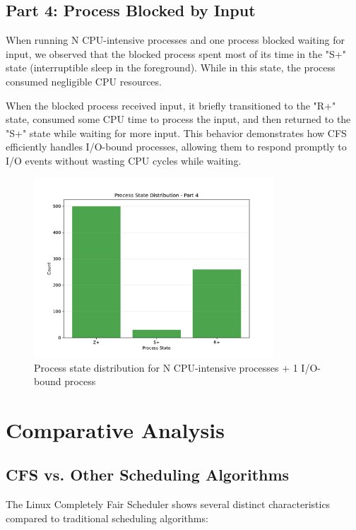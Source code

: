 \documentclass[12pt,a4paper]{article}
\begin{document}
\subsection{Part 4: Process Blocked by Input}

When running N CPU-intensive processes and one process blocked waiting for input, we observed that the blocked process spent most of its time in the "S+" state (interruptible sleep in the foreground). While in this state, the process consumed negligible CPU resources.

When the blocked process received input, it briefly transitioned to the "R+" state, consumed some CPU time to process the input, and then returned to the "S+" state while waiting for more input. This behavior demonstrates how CFS efficiently handles I/O-bound processes, allowing them to respond promptly to I/O events without wasting CPU cycles while waiting.

\begin{figure}[H]
    \centering
    \includegraphics[width=0.8\textwidth]{figures/state_dist_part4.pdf}
    \caption{Process state distribution for N CPU-intensive processes + 1 I/O-bound process}
    \label{fig:part4_state}
\end{figure}

\section{Comparative Analysis}

\subsection{CFS vs. Other Scheduling Algorithms}

The Linux Completely Fair Scheduler shows several distinct characteristics compared to traditional scheduling algorithms:
\end{document}
